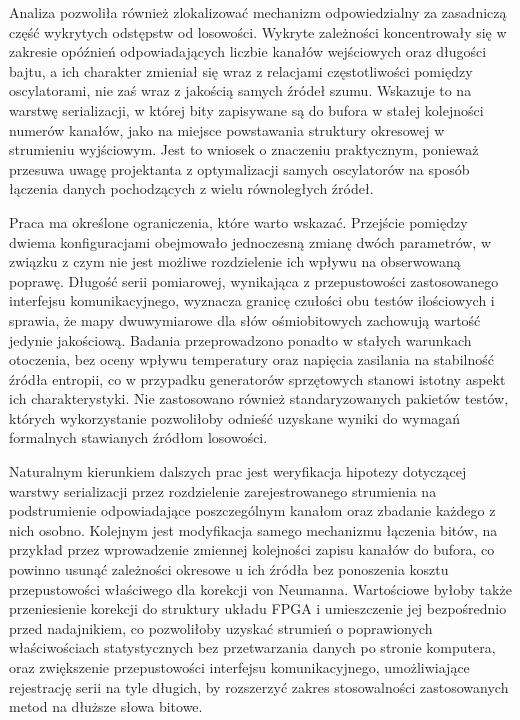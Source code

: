 Analiza pozwoliła również zlokalizować mechanizm odpowiedzialny za zasadniczą część
wykrytych odstępstw od losowości. Wykryte zależności koncentrowały się w zakresie
opóźnień odpowiadających liczbie kanałów wejściowych oraz długości bajtu, a ich charakter
zmieniał się wraz z relacjami częstotliwości pomiędzy oscylatorami, nie zaś wraz
z jakością samych źródeł szumu. Wskazuje to na warstwę serializacji, w której bity
zapisywane są do bufora w stałej kolejności numerów kanałów, jako na miejsce powstawania
struktury okresowej w strumieniu wyjściowym. Jest to wniosek o znaczeniu praktycznym,
ponieważ przesuwa uwagę projektanta z optymalizacji samych oscylatorów na sposób łączenia
danych pochodzących z wielu równoległych źródeł.

Praca ma określone ograniczenia, które warto wskazać. Przejście pomiędzy dwiema
konfiguracjami obejmowało jednoczesną zmianę dwóch parametrów, w związku z czym nie jest
możliwe rozdzielenie ich wpływu na obserwowaną poprawę. Długość serii pomiarowej,
wynikająca z przepustowości zastosowanego interfejsu komunikacyjnego, wyznacza granicę
czułości obu testów ilościowych i sprawia, że mapy dwuwymiarowe dla słów ośmiobitowych
zachowują wartość jedynie jakościową. Badania przeprowadzono ponadto w stałych warunkach
otoczenia, bez oceny wpływu temperatury oraz napięcia zasilania na stabilność źródła
entropii, co w przypadku generatorów sprzętowych stanowi istotny aspekt ich
charakterystyki. Nie zastosowano również standaryzowanych pakietów testów, których
wykorzystanie pozwoliłoby odnieść uzyskane wyniki do wymagań formalnych stawianych
źródłom losowości.

Naturalnym kierunkiem dalszych prac jest weryfikacja hipotezy dotyczącej warstwy
serializacji przez rozdzielenie zarejestrowanego strumienia na podstrumienie
odpowiadające poszczególnym kanałom oraz zbadanie każdego z nich osobno. Kolejnym jest
modyfikacja samego mechanizmu łączenia bitów, na przykład przez wprowadzenie zmiennej
kolejności zapisu kanałów do bufora, co powinno usunąć zależności okresowe u ich źródła
bez ponoszenia kosztu przepustowości właściwego dla korekcji von Neumanna. Wartościowe
byłoby także przeniesienie korekcji do struktury układu FPGA i umieszczenie jej
bezpośrednio przed nadajnikiem, co pozwoliłoby uzyskać strumień o poprawionych
właściwościach statystycznych bez przetwarzania danych po stronie komputera, oraz
zwiększenie przepustowości interfejsu komunikacyjnego, umożliwiające rejestrację serii
na tyle długich, by rozszerzyć zakres stosowalności zastosowanych metod na dłuższe słowa
bitowe.